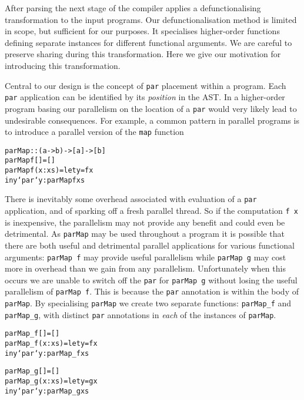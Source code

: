 After parsing the next stage of the compiler applies a defunctionalising
transformation to the input programs. Our defunctionalisation method is limited
in scope, but sufficient for our purposes. It specialises higher-order
functions defining separate instances for different functional arguments. We
are careful to preserve sharing during this transformation. Here we give our
motivation for introducing this transformation.

Central to our design is the concept of \verb-par- placement within a program.
Each \verb-par- application can be identified by its \emph{position} in the
AST. In a higher-order program basing our parallelism on the location of a
\verb-par- would very likely lead to undesirable consequences. For example, a common pattern
in parallel programs is to introduce a parallel version of the \verb-map-
function

\begin{alltt}
    parMap :: (a -> b) -> [a] -> [b]
    parMap f []     = []
    parMap f (x:xs) = let y = f x
                      in y `par` y : parMap f xs
\end{alltt}

There is inevitably some overhead associated with evaluation of a \verb-par-
application, and of sparking off a fresh parallel thread.  So if the
computation \verb-f x- is inexpensive, the parallelism may not provide any
benefit and could even be detrimental. As \verb-parMap- may be used throughout
a program it is possible that there are both useful and detrimental parallel
applications for various functional arguments: \verb-parMap f- may provide
useful parallelism while \verb-parMap g- may cost more in overhead than we gain
from any parallelism.  Unfortunately when this occurs we are unable to switch
off the \verb-par- for \verb-parMap g- without losing the useful parallelism of
\verb-parMap f-. This is because the \verb-par- annotation is within the body
of \verb-parMap-. By specialising \verb-parMap- we create two separate
functions: \verb-parMap_f- and \verb-parMap_g-, with distinct \verb-par-
annotations in \emph{each} of the instances of \verb-parMap-.

\pagebreak

\begin{alltt}
    parMap_f []     = []
    parMap_f (x:xs) = let y = f x
                      in y `par` y : parMap_f xs

    parMap_g []     = []
    parMap_g (x:xs) = let y = g x
                      in y `par` y : parMap_g xs
\end{alltt}



